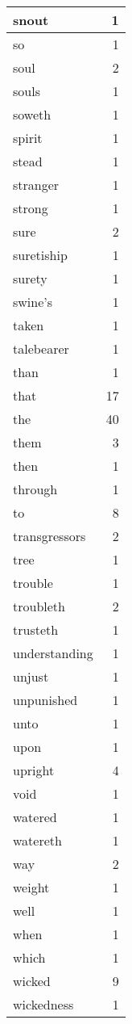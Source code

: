 \begin{center}
\begin{longtable}{l|r}
snout & 1\\ \hline 
so & 1\\ \hline 
soul & 2\\ \hline 
souls & 1\\ \hline 
soweth & 1\\ \hline 
spirit & 1\\ \hline 
stead & 1\\ \hline 
stranger & 1\\ \hline 
strong & 1\\ \hline 
sure & 2\\ \hline 
suretiship & 1\\ \hline 
surety & 1\\ \hline 
swine's & 1\\ \hline 
taken & 1\\ \hline 
talebearer & 1\\ \hline 
than & 1\\ \hline 
that & 17\\ \hline 
the & 40\\ \hline 
them & 3\\ \hline 
then & 1\\ \hline 
through & 1\\ \hline 
to & 8\\ \hline 
transgressors & 2\\ \hline 
tree & 1\\ \hline 
trouble & 1\\ \hline 
troubleth & 2\\ \hline 
trusteth & 1\\ \hline 
understanding & 1\\ \hline 
unjust & 1\\ \hline 
unpunished & 1\\ \hline 
unto & 1\\ \hline 
upon & 1\\ \hline 
upright & 4\\ \hline 
void & 1\\ \hline 
watered & 1\\ \hline 
watereth & 1\\ \hline 
way & 2\\ \hline 
weight & 1\\ \hline 
well & 1\\ \hline 
when & 1\\ \hline 
which & 1\\ \hline 
wicked & 9\\ \hline 
wickedness & 1\\ \hline 

\end{longtable}
\end{center}
